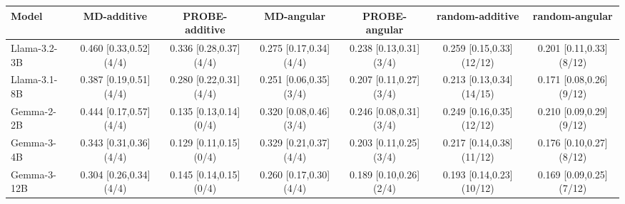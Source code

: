 \begin{tabular}{lcccccc}
\toprule
Model & MD-additive & PROBE-additive & MD-angular & PROBE-angular & random-additive & random-angular \\
\midrule
Llama-3.2-3B & 0.460 [0.33,0.52] (4/4) & 0.336 [0.28,0.37] (4/4) & 0.275 [0.17,0.34] (4/4) & 0.238 [0.13,0.31] (3/4) & 0.259 [0.15,0.33] (12/12) & 0.201 [0.11,0.33] (8/12) \\
Llama-3.1-8B & 0.387 [0.19,0.51] (4/4) & 0.280 [0.22,0.31] (4/4) & 0.251 [0.06,0.35] (3/4) & 0.207 [0.11,0.27] (3/4) & 0.213 [0.13,0.34] (14/15) & 0.171 [0.08,0.26] (9/12) \\
Gemma-2-2B & 0.444 [0.17,0.57] (4/4) & 0.135 [0.13,0.14] (0/4) & 0.320 [0.08,0.46] (3/4) & 0.246 [0.08,0.31] (3/4) & 0.249 [0.16,0.35] (12/12) & 0.210 [0.09,0.29] (9/12) \\
Gemma-3-4B & 0.343 [0.31,0.36] (4/4) & 0.129 [0.11,0.15] (0/4) & 0.329 [0.21,0.37] (4/4) & 0.203 [0.11,0.25] (3/4) & 0.217 [0.14,0.38] (11/12) & 0.176 [0.10,0.27] (8/12) \\
Gemma-3-12B & 0.304 [0.26,0.34] (4/4) & 0.145 [0.14,0.15] (0/4) & 0.260 [0.17,0.30] (4/4) & 0.189 [0.10,0.26] (2/4) & 0.193 [0.14,0.23] (10/12) & 0.169 [0.09,0.25] (7/12) \\
\bottomrule
\end{tabular}
